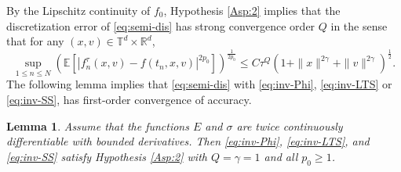 \documentclass[11pt,reqno]{amsproc}
\newtheorem{lemma}[Def]{Lemma}
\newcommand{\R}{\mathbb{R}}
\numberwithin{equation}{section}
\newcommand{\E}{\mathbb{E}}\allowdisplaybreaks[4]
\begin{document}
By the Lipschitz continuity of $f_0$, 
Hypothesis \ref{Asp:2} implies that the discretization error of \eqref{eq:semi-dis} has strong convergence order $Q$ in the sense that for any $(x,v)\in\mathbb{T}^d\times \R^{d}$,
\begin{equation}\label{eq:SC-semi}
\sup_{1\le n\le N}\left(\E\left[|f_n^\tau(x,v)-f(t_n,x,v)|^{2p_0}\right]\right)^{\frac{1}{2p_0}}\le C\tau^{Q}(1+\|x\|^{2\gamma}+\|v\|^{2\gamma})^{\frac12}.
\end{equation}
The following lemma implies that 
\eqref{eq:semi-dis} with 
\eqref{eq:inv-Phi}, 
 \eqref{eq:inv-LTS} or \eqref{eq:inv-SS},
has first-order convergence of accuracy.
\begin{lemma}\label{lem:local} 
Assume that the functions $E$ and $\sigma$ are twice continuously differentiable with bounded derivatives.
Then \eqref{eq:inv-Phi}, \eqref{eq:inv-LTS}, and \eqref{eq:inv-SS} satisfy Hypothesis \ref{Asp:2} with $Q=\gamma=1$ and all $p_0\ge1$.
\end{lemma}
\end{document}
